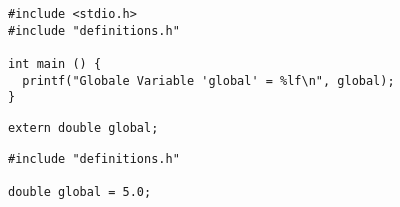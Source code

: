 
\begin{frame}[fragile]
%
\begin{codebox}
\begin{verbatim}
#include <stdio.h>
#include "definitions.h"

int main () {
  printf("Globale Variable 'global' = %lf\n", global);
}
\end{verbatim}
\end{codebox}

\begin{codebox}
\begin{verbatim}
extern double global;
\end{verbatim}
\end{codebox}

\begin{codebox}
\begin{verbatim}
#include "definitions.h"

double global = 5.0;
\end{verbatim}
\end{codebox}
%
\end{frame}